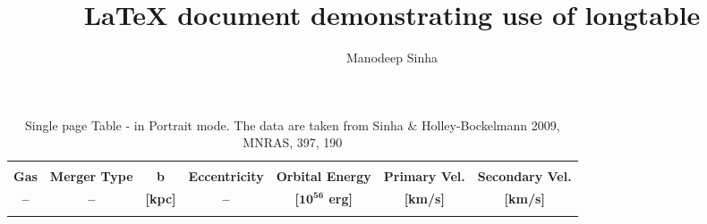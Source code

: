 \documentclass{article}
\begin{document}
\title{\LaTeX{} document demonstrating use of longtable}
\author{Manodeep Sinha \\
  }

\maketitle

\begin{center}
\renewcommand{\thefootnote}{\fnsymbol{footnote}}
\renewcommand{\arraystretch}{0.79}
\scriptsize
\begin{longtable}{rcrrrrr}
\caption[Portrait, single page table]{Single page Table - in Portrait mode. The data
are taken from Sinha \& Holley-Bockelmann 2009, MNRAS, 397, 190 }
\label{table:mergersims} \\

\hline \hline \\[-2ex]
   \multicolumn{1}{c}{\textbf{Gas}} &
   \multicolumn{1}{c}{\textbf{Merger Type}} &
   \multicolumn{1}{c}{\textbf{b}} &
   \multicolumn{1}{c}{\textbf{Eccentricity }} &
   \multicolumn{1}{c}{\textbf{Orbital Energy}} &
   \multicolumn{1}{c}{\textbf{Primary Vel.}} &
   \multicolumn{1}{c}{\textbf{Secondary Vel.}}  \\[0.8ex] 
   \multicolumn{1}{c}{\textbf{--}} &
   \multicolumn{1}{c}{\textbf{--}} &
   \multicolumn{1}{c}{\textbf{[kpc]}} &
   \multicolumn{1}{c}{\textbf{--}} &
   \multicolumn{1}{c}{\textbf{[$\mathbf{10^{56}}$ erg]}} &
   \multicolumn{1}{c}{\textbf{[km/s]}} &
   \multicolumn{1}{c}{\textbf{[km/s]}} \\[0.5ex]\hline \hline \\[-2ex]
\endfirsthead


\end{longtable}
\end{center}
\end{document}
